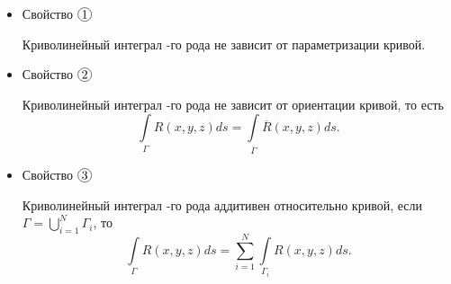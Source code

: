 \begin{itemize}
    \item Свойство $ \circled{1} $
          \begin{statement}
              Криволинейный интеграл -го рода не зависит от параметризации кривой.
          \end{statement}

          \newpage

    \item Свойство $ \circled{2} $
          \begin{statement}
              Криволинейный интеграл -го рода не зависит от ориентации кривой, то есть
              \[
                  \int\limits_\Gamma R(x,y,z)ds = \int\limits_{\overline{\Gamma}}\overline{R}(x,y,z)ds.
              \]
          \end{statement}

    \item Свойство $ \circled{3} $
          \begin{statement}
              Криволинейный интеграл -го рода аддитивен относительно кривой, если $ \Gamma = \bigcup\limits_{i=1}^N \Gamma_i $, то
              \[
                  \int\limits_\Gamma R(x,y,z)ds = \sum_{i=1}^{N}\int\limits_{\Gamma_i}R(x,y,z)ds.
              \]
          \end{statement}
\end{itemize}


